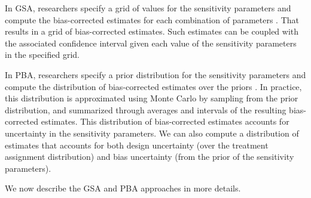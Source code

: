 \documentclass[11pt]{article}
\theoremstyle{definition}
\begin{document}
 In GSA, researchers specify a grid of values for the sensitivity parameters 
 and compute the bias-corrected estimates for each combination
  of parameters \citep{greenland1996basic,rosenbaum2005sensitivity}.
 That results in a grid of bias-corrected estimates.
 Such estimates can be coupled with the associated confidence interval given each
 value of the sensitivity parameters in the specified grid. 

 In PBA, researchers specify a prior distribution for the
 sensitivity parameters and compute the distribution of bias-corrected estimates 
 over the priors \citep{Greenland2005,Lash2014,Fox2021}. 
 In practice, this distribution is approximated using
  Monte Carlo by sampling from the prior distribution, and summarized
    through averages and intervals of the resulting bias-corrected estimates.
 This distribution of bias-corrected estimates accounts for uncertainty
  in the sensitivity parameters.
  We can also compute a distribution of estimates that accounts for both design uncertainty
   (over the treatment assignment distribution) and bias uncertainty (from the prior of the sensitivity parameters).
  
We now describe the GSA and PBA approaches in more details.
\end{document}
